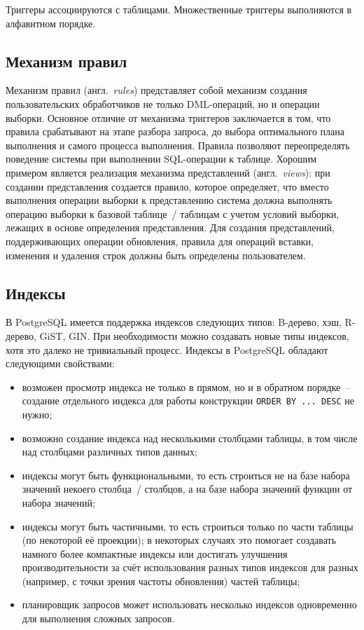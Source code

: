 Триггеры ассоциируются с таблицами. Множественные триггеры выполняются в алфавитном порядке.

\subsection{Механизм правил}\label{subsec:rules}

Механизм правил (англ. \textit{rules}) представляет собой механизм создания пользовательских обработчиков не только DML-операций, но и операции выборки. Основное отличие от механизма триггеров заключается в том, что правила срабатывают на этапе разбора запроса, до выбора оптимального плана выполнения и самого процесса выполнения. Правила позволяют переопределять поведение системы при выполнении SQL-операции к таблице. Хорошим примером является реализация механизма представлений (англ. \textit{views}): при создании представления создается правило, которое определяет, что вместо выполнения операции выборки к представлению система должна выполнять операцию выборки к базовой таблице / таблицам с учетом условий выборки, лежащих в основе определения представления. Для создания представлений, поддерживающих операции обновления, правила для операций вставки, изменения и удаления строк должны быть определены пользователем.

\subsection{Индексы}\label{subsec:indexes}

В PostgreSQL имеется поддержка индексов следующих типов: B-дерево, хэш, R-дерево, GiST, GIN. При необходимости можно создавать новые типы индексов, хотя это далеко не тривиальный процесс. Индексы в PostgreSQL обладают следующими свойствами:
\begin{itemize}
    \item возможен просмотр индекса не только в прямом, но и в обратном порядке – создание отдельного индекса для работы конструкции \texttt{ORDER BY ... DESC} не нужно;
    \item возможно создание индекса над несколькими столбцами таблицы, в том числе над столбцами различных типов данных;
    \item индексы могут быть функциональными, то есть строиться не на базе набора значений некоего столбца / столбцов, а на базе набора значений функции от набора значений;
    \item индексы могут быть частичными, то есть строиться только по части таблицы (по некоторой её проекции); в некоторых случаях это помогает создавать намного более компактные индексы или достигать улучшения производительности за счёт использования разных типов индексов для разных (например, с точки зрения частоты обновления) частей таблицы;
    \item планировщик запросов может использовать несколько индексов одновременно для выполнения сложных запросов.
\end{itemize}

